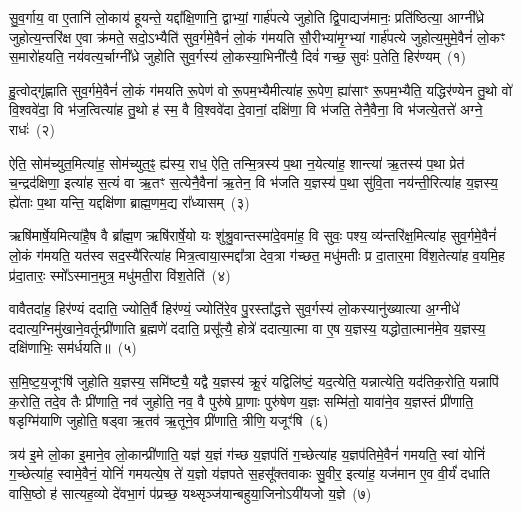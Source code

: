 \setcounter{anuvakam}{0}
सु॒व॒र्गाय॒ वा ए॒तानि॑ लो॒काय॑ हूयन्ते॒ यद्दा᳚क्षि॒णानि॒ द्वाभ्यां॒ गार्\mbox{}ह॑पत्ये जुहोति द्वि॒पाद्यज॑मानः॒ प्रति॑ष्ठित्या॒ आग्नी᳚ध्रे जुहोत्य॒न्तरि॑क्ष ए॒वा क्र॑मते॒ सदो॒\-ऽभ्यैति॑ सुव॒र्गमे॒वैनं॑ लो॒कं ग॑मयति सौ॒रीभ्या॑मृ॒ग्भ्यां गार्\mbox{}ह॑पत्ये जुहोत्य॒मुमे॒वैनं॑ लो॒कꣳ स॒मारो॑हयति॒ नय॑वत्य॒र्चाग्नी᳚ध्रे जुहोति सुव॒र्गस्य॑ लो॒कस्या॒भिनी᳚त्यै॒ दिवं॑ गच्छ॒ सुवः॑ प॒तेति॒ हिर॑ण्यम्~(१)\ip

हु॒त्वोद्गृ॑ह्णाति सुव॒र्गमे॒वैनं॑ लो॒कं ग॑मयति रू॒पेण॑ वो रू॒पम॒भ्यैमीत्या॑ह रू॒पेण॒ ह्या॑साꣳ रू॒पम॒भ्यैति॒ यद्धिर॑ण्येन तु॒थो वो॑ वि॒श्ववे॑दा॒ वि भ॑ज॒त्वित्या॑ह तु॒थो ह॑ स्म॒ वै वि॒श्ववे॑दा दे॒वानां॒ दक्षि॑णा॒ वि भ॑जति॒ तेनै॒वैना॒ वि भ॑जत्ये॒तत्ते॑ अग्ने॒ राधः॑~(२)\ip

ऐति॒ सोम॑च्युत॒मित्या॑ह॒ सोम॑च्युत॒ꣴ॒ ह्य॑स्य॒ राध॒ ऐति॒ तन्मि॒त्रस्य॑ प॒था न॒येत्या॑ह॒ शान्त्या॑ ऋ॒तस्य॑ प॒था प्रेत॑ च॒न्द्रद॑क्षिणा॒ इत्या॑ह स॒त्यं वा ऋ॒तꣳ स॒त्येनै॒वैना॑ ऋ॒तेन॒ वि भ॑जति य॒ज्ञस्य॑ प॒था सु॑वि॒ता नय॑न्ती॒रित्या॑ह य॒ज्ञस्य॒ ह्ये॑ताः प॒था यन्ति॒ यद्दक्षि॑णा ब्राह्म॒णम॒द्य रा᳚ध्यासम्~(३)\ip

ऋषि॑मार्\mbox{}षे॒यमित्या॑है॒ष वै ब्रा᳚ह्म॒ण ऋषि॑रार्\mbox{}षे॒यो यः शु॑श्रु॒वान्तस्मा॑दे॒वमा॑ह॒ वि सुवः॒ पश्य॒ व्य॑न्तरि॑क्ष॒मित्या॑ह सुव॒र्गमे॒वैनं॑ लो॒कं ग॑मयति॒ यत॑स्व सद॒स्यै॑रित्या॑ह मित्र॒त्वाया॒स्मद्दा᳚त्रा देव॒त्रा ग॑च्छत॒ मधु॑मतीः प्र दा॒तार॒मा वि॑श॒तेत्या॑ह व॒यमि॒ह प्र॑दा॒तारः॒ स्मो᳚\-ऽस्मान॒मुत्र॒ मधु॑मती॒रा वि॑श॒तेति॑~(४)\ip

वावैतदा॑ह॒ हिर॑ण्यं ददाति॒ ज्योति॒र्वै हिर॑ण्यं॒ ज्योति॑रे॒व पु॒रस्ता᳚द्धत्ते सुव॒र्गस्य॑ लो॒कस्यानु॑ख्यात्या अ॒ग्नीधे॑ ददात्य॒ग्निमु॑खाने॒वर्तून्प्री॑णाति ब्र॒ह्मणे॑ ददाति॒ प्रसू᳚त्यै॒ होत्रे॑ ददात्या॒त्मा वा ए॒ष य॒ज्ञस्य॒ यद्धोता॒त्मान॑मे॒व य॒ज्ञस्य॒ दक्षि॑णाभिः॒ सम॑र्धयति॥~(५)\ip

{\anuvakamend[{हिर॑ण्य॒ꣳ॒ राधो॑ राध्यासम॒मुत्र॒ मधु॑मती॒रा वि॑श॒तेत्य॒ष्टात्रिꣳ॑शच्च}]}

स॒मि॒ष्ट॒य॒जूꣳषि॑ जुहोति य॒ज्ञस्य॒ समि॑ष्ट्यै॒ यद्वै य॒ज्ञस्य॑ क्रू॒रं यद्विलि॑ष्टं॒ यद॒त्येति॒ यन्नात्येति॒ यद॑तिक॒रोति॒ यन्नापि॑ क॒रोति॒ तदे॒व तैः प्री॑णाति॒ नव॑ जुहोति॒ नव॒ वै पुरु॑षे प्रा॒णाः पुरु॑षेण य॒ज्ञः सम्मि॑तो॒ यावा॑ने॒व य॒ज्ञस्तं प्री॑णाति॒ षडृग्मि॑याणि जुहोति॒ षड्वा ऋ॒तव॑ ऋ॒तूने॒व प्री॑णाति॒ त्रीणि॒ यजूꣳ॑षि~(६)\ip

त्रय॑ इ॒मे लो॒का इ॒माने॒व लो॒कान्प्री॑णाति॒ यज्ञ॑ य॒ज्ञं ग॑च्छ य॒ज्ञप॑तिं ग॒च्छेत्या॑ह य॒ज्ञप॑तिमे॒वैनं॑ गमयति॒ स्वां योनिं॑ ग॒च्छेत्या॑ह॒ स्वामे॒वैनं॒ योनिं॑ गमयत्ये॒ष ते॑ य॒ज्ञो य॑ज्ञपते स॒हसू᳚क्तवाकः सु॒वीर॒ इत्या॑ह॒ यज॑मान ए॒व वी॒र्यं॑ दधाति वासि॒ष्ठो ह॑ सात्यह॒व्यो दे॑वभा॒गं प॑प्रच्छ॒ यथ्सृञ्ज॑यान्बहुया॒जिनो\-ऽयी॑यजो य॒ज्ञे~(७)\ip

